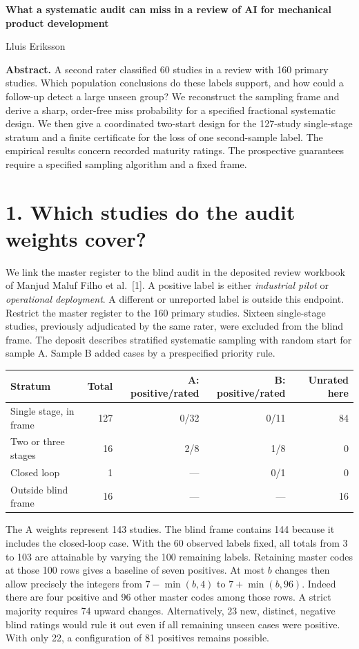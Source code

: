 \documentclass[11pt]{article}
\begin{document}
\begin{center}{\Large\bfseries What a systematic audit can miss in a review of AI for mechanical product development\par}\vspace{6pt}
Lluis Eriksson\end{center}
\textbf{Abstract.} A second rater classified 60 studies in a review with 160 primary studies. Which population conclusions do these labels support, and how could a follow-up detect a large unseen group? We reconstruct the sampling frame and derive a sharp, order-free miss probability for a specified fractional systematic design. We then give a coordinated two-start design for the 127-study single-stage stratum and a finite certificate for the loss of one second-sample label. The empirical results concern recorded maturity ratings. The prospective guarantees require a specified sampling algorithm and a fixed frame.

\section*{1. Which studies do the audit weights cover?}
We link the master register to the blind audit in the deposited review workbook of Manjud Maluf Filho et al.\ [1]. A positive label is either \emph{industrial pilot} or \emph{operational deployment}. A different or unreported label is outside this endpoint. Restrict the master register to the 160 primary studies. Sixteen single-stage studies, previously adjudicated by the same rater, were excluded from the blind frame. The deposit describes stratified systematic sampling with random start for sample A. Sample B added cases by a prespecified priority rule.

\begin{center}\begin{tabular}{lrrrr}\toprule
Stratum & Total & A: positive/rated & B: positive/rated & Unrated here\\\midrule
Single stage, in frame&127&0/32&0/11&84\\
Two or three stages&16&2/8&1/8&0\\
Closed loop&1&---&0/1&0\\
Outside blind frame&16&---&---&16\\\bottomrule
\end{tabular}\end{center}
The A weights represent 143 studies. The blind frame contains 144 because it includes the closed-loop case. With the 60 observed labels fixed, all totals from 3 to 103 are attainable by varying the 100 remaining labels. Retaining master codes at those 100 rows gives a baseline of seven positives. At most $b$ changes then allow precisely the integers from $7-\min(b,4)$ to $7+\min(b,96)$. Indeed there are four positive and 96 other master codes among those rows. A strict majority requires 74 upward changes. Alternatively, 23 new, distinct, negative blind ratings would rule it out even if all remaining unseen cases were positive. With only 22, a configuration of 81 positives remains possible.
\newpage
\end{document}

